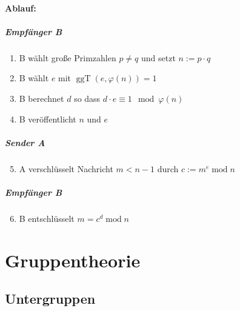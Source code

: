\documentclass[a5paper, 10pt]{book}
\DeclareMathOperator{\romanmod}{mod}
\DeclareMathOperator{\ggT}{ggT}
\begin{document}
			\subsubsection{Ablauf:}
				\paragraph{Empfänger B}
					\begin{enumerate}
						\item B wählt große Primzahlen $p\neq q$ und setzt $n := p\cdot q$
						\item B wählt $e$ mit $\ggT(e, \varphi(n)) = 1$
						\item B berechnet $d$ so dass $d\cdot e \equiv 1 \mod \varphi(n)$
						\item B veröffentlicht $n$ und $e$
					\end{enumerate}
				
				\paragraph{Sender A}
					\begin{enumerate}
						\setcounter{enumi}{4}
						\item A verschlüsselt Nachricht $m < n-1$ durch $c := m^e \romanmod n$
					\end{enumerate}
				
				\paragraph{Empfänger B}
					\begin{enumerate}
						\setcounter{enumi}{5}
						\item B entschlüsselt $m = c^d \romanmod n$
					\end{enumerate}
				
				
	\chapter{Gruppentheorie}
	
		\section{Untergruppen}
		
\end{document}
